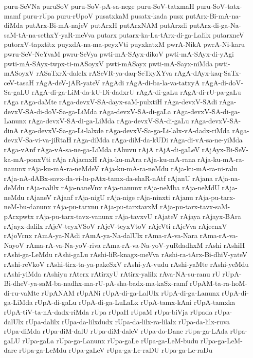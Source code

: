{puru-SeVNa
puruSoV
puru-SoV-pA-sa-nege
puru-SoV-tatxmaH
puru-SoV-tatx-mamf
puru-rUpa
puru-rUpoV
pusatxkaM
pusatx-kada
pusx
putArx-Bi-mA-na-diMda
putArx-Bi-mA-najeV
putArxH
putArxNAM
putArxdi
putArx-di-ga-Na-saM-tA-na-sethxY-yaR-meVva
putarx
putarx-ka-La-tArx-di-ga-Lalilx
putarxneV
putorxV-tapxtitx
puyxdA-na-ma-peyxVti
puyxkatxM
pwrA-NikA
pwrA-Ni-karu
pwru-SeV-NeYvaM
pwru-SeVya
pwti-mA-SAyx-dikoV
pwti-mA-SAyx-di-yAgi
pwti-mA-SAyx-twpx-ti-mASoyxV
pwti-mASayx
pwti-mA-Sayx-niMda
pwti-mASoyxV
rASaTxrX-dalelx
rASeVR-ya-daq-SeTxyXYva
rAgA-dAyx-kaq-SaTx-ceV-tasaH
rAgA-deV-jAR-yateV
rAgAdi
rAgA-di-ba-la-va-tatxyA
rAgA-di-doV-Sa-gaLU
rAgA-di-ga-LiM-da-kU-Di-dadxrU
rAgA-di-gaLu
rAgA-di-rU-pa-gaLu
rAga
rAga-daMte
rAga-devxV-SA-dayx-saM-pulxtiH
rAga-devxV-SAdi
rAga-devxV-SA-di-doV-Sa-ga-LiMda
rAga-devxV-SA-di-gaLa
rAga-devxV-SA-di-ga-Lanunx
rAga-devxV-SA-di-ga-LiMda
rAga-devxV-SA-di-gaLu
rAga-devxV-SA-dinA
rAga-devxV-Sa-ga-Li-lalxde
rAga-devxV-Sa-ga-Li-lalx-vA-dadx-riMda
rAga-devxV-Sa-vi-va-jiRtaH
rAga-diMda
rAga-diM-da-kUDi
rAga-di-vA-sa-ne-yiMda
rAga-vAnf
rAga-vA-sa-ne-ga-LiMda
rAhuvu
rAjA
rAjA-di-gaLeV
rAjAyx-Bi-SeV-ka-mA-ponxVti
rAja
rAjacnxH
rAja-ku-mAra
rAja-ku-mA-rana
rAja-ku-mA-ra-nanunx
rAja-ku-mA-ra-neMdeV
rAja-ku-mA-ra-neMdu
rAja-ku-mA-ra-ni-ralu
rAja-nA-dABx-savx-da-vi-lu-pAtx-tamx-da-shaR-nAtf
rAjanU
rAjana
rAja-na-deMdu
rAja-nalilx
rAja-naneVnx
rAja-nanunx
rAja-neMba
rAja-neMdU
rAja-neMdu
rAjaneV
rAjanf
rAja-nigU
rAja-nige
rAja-ninxti
rAjanu
rAja-pu-tarx-neM-bu-danunx
rAja-pu-tarxnu
rAja-pu-tarxtavxM
rAja-pu-tarx-tavx-saM-pArxpwtx
rAja-pu-tarx-tavx-vanunx
rAja-tavxvU
rAjateV
rAjaya
rAjayx-BAra
rAjayx-dalilx
rAjeV-teyxVSoV
rAjeV-teyxVtoV
rAjeVti
rAjeVva
rAjecnxV
rAjoVcnx
rAmA-ya-NAdi
rAmA-ya-Na-dalUlx
rAma-rA-va-Nara
rAma-rA-va-NayoV
rAma-rA-va-Na-yoV-riva
rAma-rA-va-Na-yoV-yuRdadhxM
rAshi
rAshiH
rAshi-ga-LeMdu
rAshi-gaLu
rAshi-liR-knagx-meVva
rAshi-ra-tArx-Bi-dhiV-yateV
rAshi-reVkoV
rAshi-tirx-ta-ya-pakeSxV
rAshi-yA-vudu
rAshi-yaMte
rAshi-yeMdu
rAshi-yiMda
rAshiyu
rAterx
rAtirxyU
rAtirx-yalilx
rAva-NA-su-ranu
rU
rUpA-Bi-dheV-ya-saM-ba-nadhx-ma-rU-pA-sha-badx-ma-kaSx-ramf
rUpAM-ta-ra-hoM-di-ru-vaMte
rUpANAM
rUpANi
rUpA-di-ga-LalUlx
rUpA-di-ga-Lanunx
rUpA-di-ga-LiMda
rUpA-di-gaLu
rUpA-di-ga-LuLaLx
rUpA-tamx-kAni
rUpA-tamxka
rUpA-tiV-ta-nA-dadx-riMda
rUpa
rUpaH
rUpaM
rUpa-biVja
rUpada
rUpa-dalUlx
rUpa-dalilx
rUpa-da-lilxdudx
rUpa-da-lilx-ra-lilalx
rUpa-da-lilx-ruva
rUpa-diMda
rUpa-diM-dalU
rUpa-diM-daleV
rUpa-do-Dane
rUpa-ga-LAda
rUpa-gaLU
rUpa-gaLa
rUpa-ga-Lanunx
rUpa-gaLe
rUpa-ga-LeM-budu
rUpa-ga-LeM-dare
rUpa-ga-LeMdu
rUpa-gaLeV
rUpa-ga-Le-raDU
rUpa-ga-Le-raDu
}
